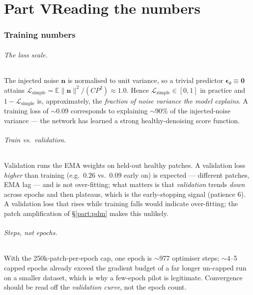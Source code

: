 \documentclass[12pt,a4paper]{article}
\newcommand{\E}{\mathbb{E}}
\newcommand{\eps}{\bm{\epsilon}}
\begin{document}
\part*{Part V\quad Reading the numbers}
\label{part:numbers}

\section{Training numbers}
\paragraph{The loss scale.} The injected noise $\bm n$ is normalised to unit
variance, so a trivial predictor $\eps_\theta\!\equiv\!\bm0$ attains
$\mathcal L_{\text{simple}}=\E\|\bm n\|^2/(CP^2)\approx 1.0$. Hence
$\mathcal L_{\text{simple}}\in[0,1]$ in practice and
$1-\mathcal L_{\text{simple}}$ is, approximately, the \emph{fraction of noise
variance the model explains}. A training loss of $\sim$0.09 corresponds to
explaining $\sim$90\% of the injected-noise variance --- the network has learned
a strong healthy-denoising score function.
\paragraph{Train vs.\ validation.} Validation runs the EMA weights on held-out
healthy patches. A validation loss \emph{higher} than training (e.g.\ $0.26$ vs.\
$0.09$ early on) is expected --- different patches, EMA lag --- and is not
over-fitting; what matters is that \emph{validation} trends \emph{down} across
epochs and then plateaus, which is the early-stopping signal (patience $6$). A
validation loss that rises while training falls would indicate over-fitting; the
patch amplification of \S\ref{part:pdm} makes this unlikely.
\paragraph{Steps, not epochs.} With the 250k-patch-per-epoch cap, one epoch is
$\sim$977 optimiser steps; $\sim$4--5 capped epochs already exceed the gradient
budget of a far longer un-capped run on a smaller dataset, which is why a
few-epoch pilot is legitimate. Convergence should be read off the
\emph{validation curve}, not the epoch count.
\end{document}
